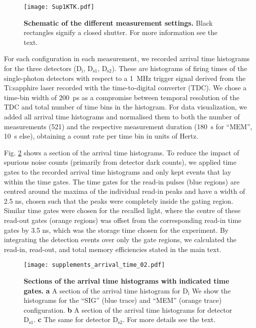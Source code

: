 \documentclass[%
 reprint,
 amsmath,amssymb,
 aps,
 pra,
]{revtex4-1}
\begin{document}
\begin{figure}[h!]
\centering
\texttt{[image: Sup1KTK.pdf]}
\caption{\textbf{Schematic of the different measurement settings.} Black rectangles signify a closed shutter. For more information see the text.}
\label{fig:measurement_settings}
\end{figure}

For each configuration in each measurement, we recorded arrival time histograms for the three detectors ($\mathrm{D_{i}}$, $\mathrm{D_{s1}}$, $\mathrm{D_{s2}}$). These are histograms of firing times of the single-photon detectors with respect to a 1~MHz trigger signal derived from the Ti:sapphire laser recorded with the time-to-digital converter (TDC). We chose a time-bin width of 200~ps as a compromise between temporal resolution of the TDC and total number of time bins in the histogram. For data visualization, we added all arrival time histograms and normalised them to both the number of measurements (521) and the respective measurement duration (180~s for ``MEM'', 10~s else), obtaining a count rate per time bin in units of Hertz. 

Fig. \ref{fig:arrival_time_02} shows a section of the arrival time histograms. To reduce the impact of spurious noise counts (primarily from detector dark counts), we applied time gates to the recorded arrival time histograms and only kept events that lay within the time gates. The time gates for the read-in pulses (blue regions) are centred around the maxima of the individual read-in peaks and have a width of 2.5 ns, chosen such that the peaks were completely inside the gating region. Similar time gates were chosen for the recalled light, where the centre of these read-out gates (orange regions) was offset from the corresponding read-in time gates by 3.5 ns, which was the storage time chosen for the experiment. By integrating the detection events over only the gate regions, we calculated the read-in, read-out, and total memory efficiencies stated in the main text.  

\begin{figure}
\centering
\texttt{[image: supplements\_arrival\_time\_02.pdf]}
\caption{\textbf{Sections of the arrival time histograms with indicated time gates.} \textbf{a} A section of the arrival time histogram for $\mathrm{D_{i}}$ We show the histograms for the ``SIG'' (blue trace) and ``MEM'' (orange trace) configuration. \textbf{b} A section of the arrival time histograms for detector $\mathrm{D_{s1}}$. \textbf{c} The same for detector $\mathrm{D_{s2}}$. For more details see the text.}
\label{fig:arrival_time_02}
\end{figure}
\end{document}
